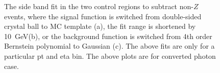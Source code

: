 \begin{figure}[!htbp]
{}
\quad
{}
\caption [] {The side band fit in the two control regions to subtract non-$Z$ events, where the signal function is switched from double-sided crystal ball to MC template (a), the fit range is shortened by 10~GeV(b), or the background function is switched from 4th order Bernstein polynomial to Gaussian (c). The above fits are only for a particular pt and eta bin. The above plots are for converted photon case.}
\label{fig:egammafake_fit_syst_converted}
\end{figure} 

